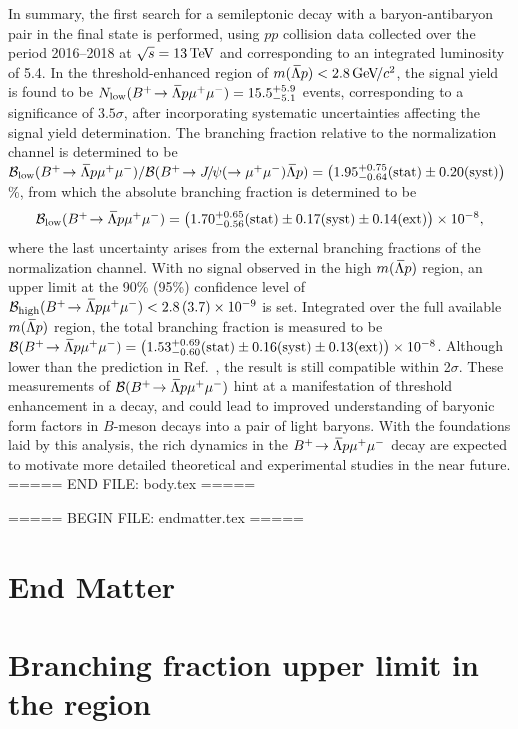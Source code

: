 In summary, the first search for a semileptonic  decay with a baryon-antibaryon pair in the final state is performed, using $pp$ collision data collected over the period 2016--2018 at $\sqrt{s}=13\tev$ and corresponding to an integrated luminosity of  5.4\invfb.
In the threshold-enhanced region of $m(\lamp)<2.8\gevcc$, the signal yield is found to be
\mbox{$N_{\rm low}(\btlpmm) = 15.5 ^{+5.9}_{-5.1}$}
events, corresponding to a significance of $3.5\sigma$, after incorporating systematic uncertainties affecting the signal yield determination.
The branching fraction relative to the normalization channel is determined to be
\mbox{$\BF_{\rm low}(\btlpmm)/\BF(\btjpsimmlp) = \left(1.95^{ +0.75}_{-0.64}(\rm stat)\pm 0.20(\rm syst)\right)$\%},
from which the absolute branching fraction is determined to be
\begin{equation*}
   \BF_{\rm low}(\btlpmm) = \left(1.70^{+0.65}_{-0.56}(\rm stat)\pm0.17(\rm syst)\pm0.14(\rm ext)\right) \times 10^{-8},
\end{equation*}
where the last uncertainty arises from the external branching fractions of the normalization channel. With no signal observed in the high $m(\lamp)$ region,  an upper limit at the 90\% (95\%) confidence level of
\mbox{$\BF_{\rm high}(\btlpmm) < 2.8\,(3.7) \times 10^{-9}$}
is set. Integrated over the full available $m(\lamp)$ region, the total branching fraction is measured to be
\mbox{$\BF(\btlpmm)=\left(1.53^{+0.69}_{-0.60}(\text{stat}) \pm 0.16(\text{syst}) \pm 0.13(\text{ext})\right) \times 10^{-8}$}.
Although lower than the prediction in Ref.~\cite{Dutta:2014yta}, the result is still compatible within 2$\sigma$.
These measurements of $\BF(\btlpmm)$ hint at a manifestation of threshold enhancement in a  decay, and could lead to improved understanding of baryonic form factors in $B$-meson decays into a pair of light baryons.
With the foundations laid by this analysis, the rich dynamics in the $\btlpmm$ decay are expected to motivate more detailed theoretical and experimental studies in the near future.
===== END FILE: body.tex =====

===== BEGIN FILE: endmatter.tex =====
\clearpage
\section*{End Matter}

\section{Branching fraction upper limit in the region }
\label{Mat:ULhighM}

